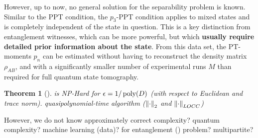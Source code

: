 \documentclass[
reprint,
aps,
pra,
floatfix,
]{revtex4-2}
\theoremstyle{plain}
\newtheorem{theorem}{Theorem}
\newtheorem{question}{Question}
\theoremstyle{definition}
\newcommand{\dm}{\rho}
\begin{document}
However, up to now, no general solution for the separability problem is known.
Similar to the PPT condition, the $p_3$-PPT condition applies to mixed states and is completely independent of the state in question. This is a key distinction from entanglement witnesses, which can be more powerful, but which \textbf{usually require detailed prior information about the state}.
From this data set, the PT-moments $p_n$ can be estimated without having to reconstruct the density matrix $\dm_{AB}$, and with a significantly smaller number of experimental runs $M$ than required for full quantum state tomography.
\begin{theorem}[\cite{gurvitsClassicalDeterministicComplexity2003}]
	 is NP-Hard for $\epsilon=1/\operatorname{\textup{poly}}(D)$ (with respect to Euclidean  and trace norm).
	\cite{ioannouComputationalComplexityQuantum2007}
	\cite{dohertyCompleteFamilySeparability2004}
	quasipolynomial-time algorithm ($\norm{\cdot}_2$ and $\norm{\cdot}_{LOCC}$) \cite{brandaoQuasipolynomialtimeAlgorithmQuantum2011}
\end{theorem}
	However, we do not know 
	approximately correct complexity? quantum complexity? machine learning (data)? for entanglement () problem? multipartite?
\end{document}
